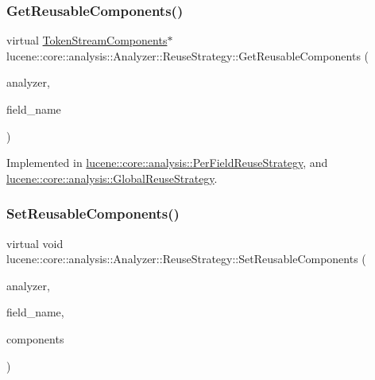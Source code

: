 \subsubsection{\texorpdfstring{Get\+Reusable\+Components()}{GetReusableComponents()}}
{\footnotesize\ttfamily virtual \mbox{\hyperlink{classlucene_1_1core_1_1analysis_1_1TokenStreamComponents}{Token\+Stream\+Components}}$\ast$ lucene\+::core\+::analysis\+::\+Analyzer\+::\+Reuse\+Strategy\+::\+Get\+Reusable\+Components (\begin{DoxyParamCaption}\item[{\mbox{\hyperlink{classlucene_1_1core_1_1analysis_1_1Analyzer}{Analyzer}} \&}]{analyzer,  }\item[{\mbox{\hyperlink{ZlibCrc32_8h_a2c212835823e3c54a8ab6d95c652660e}{const}} std\+::string \&}]{field\+\_\+name }\end{DoxyParamCaption})\hspace{0.3cm}{\ttfamily [pure virtual]}}



Implemented in \mbox{\hyperlink{classlucene_1_1core_1_1analysis_1_1PerFieldReuseStrategy_ab0d86155823842bb28e43bbbec7c06d3}{lucene\+::core\+::analysis\+::\+Per\+Field\+Reuse\+Strategy}}, and \mbox{\hyperlink{classlucene_1_1core_1_1analysis_1_1GlobalReuseStrategy_a79b31d1f8bf9bec685377f6dbff3c5ba}{lucene\+::core\+::analysis\+::\+Global\+Reuse\+Strategy}}.

\mbox{\label{classlucene_1_1core_1_1analysis_1_1Analyzer_1_1ReuseStrategy_a78a1328d5564e78e2168169b73094b23}} 
\subsubsection{\texorpdfstring{Set\+Reusable\+Components()}{SetReusableComponents()}}
{\footnotesize\ttfamily virtual void lucene\+::core\+::analysis\+::\+Analyzer\+::\+Reuse\+Strategy\+::\+Set\+Reusable\+Components (\begin{DoxyParamCaption}\item[{\mbox{\hyperlink{classlucene_1_1core_1_1analysis_1_1Analyzer}{Analyzer}} \&}]{analyzer,  }\item[{\mbox{\hyperlink{ZlibCrc32_8h_a2c212835823e3c54a8ab6d95c652660e}{const}} std\+::string \&}]{field\+\_\+name,  }\item[{\mbox{\hyperlink{classlucene_1_1core_1_1analysis_1_1TokenStreamComponents}{Token\+Stream\+Components}} $\ast$}]{components }\end{DoxyParamCaption})\hspace{0.3cm}{\ttfamily [pure virtual]}}



